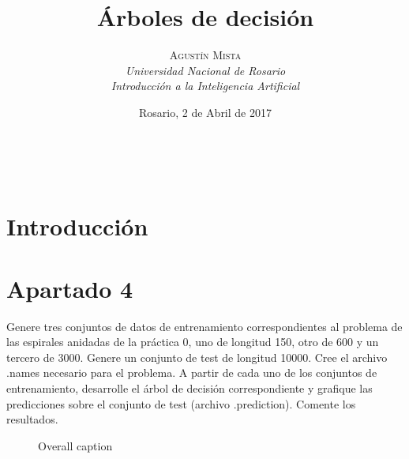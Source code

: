 \documentclass[a4paper, 11pt]{article} %
\title{\textbf{Árboles de decisión}}
\author{
	\textsc{Agustín Mista}\\
	\textit{Universidad Nacional de Rosario}\\
 	\textit{Introducción a la Inteligencia Artificial}
}
\date{Rosario, 2 de Abril de 2017}
\makeatletter
\renewcommand{\maketitle}{ %
\begin{flushright} %
{\LARGE\@title} %

\vspace{50pt} %

{\large\@author} %
\\\@date %

\vspace{40pt} %
\end{flushright}
}
\makeatother
\begin{document}
\maketitle %




\vspace{20pt} %


\section*{Introducción}


\pagebreak


\section*{Apartado 4}  Genere tres conjuntos de datos de entrenamiento
correspondientes al problema de las espirales anidadas de la práctica 0, uno de
longitud 150, otro de 600 y un tercero de 3000. Genere un conjunto de test de
longitud 10000. Cree el archivo .names necesario para el problema. A partir de
cada uno de los conjuntos de entrenamiento, desarrolle el árbol de decisión
correspondiente y grafique las predicciones sobre el conjunto de test (archivo
.prediction). Comente los resultados.

\begin{figure}
  \centering
  \caption{\label{ref_label_overall}Overall caption}
\end{figure}
\end{document}
